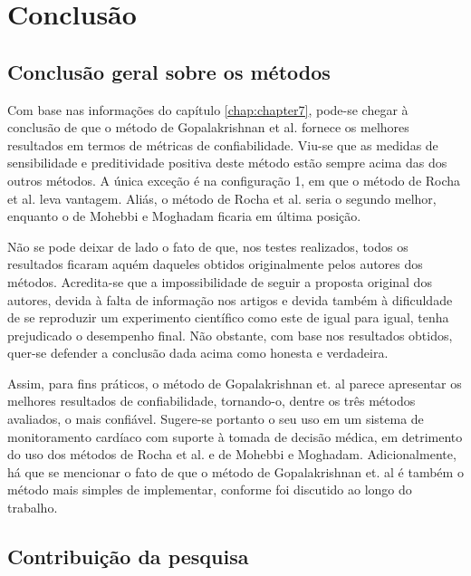 
\chapter[Conclusão]{Conclusão}
\thispagestyle{empty}
\label{chap:chapter8}

\section{Conclusão geral sobre os métodos}
Com base nas informações do capítulo \ref{chap:chapter7}, pode-se chegar à conclusão de que o método de Gopalakrishnan et al. fornece os melhores resultados em termos de métricas de confiabilidade. Viu-se que as medidas de sensibilidade e preditividade positiva deste método estão sempre acima das dos outros métodos. A única exceção é na configuração 1, em que o método de Rocha et al. leva vantagem. Aliás, o método de Rocha et al. seria o segundo melhor, enquanto o de Mohebbi e Moghadam ficaria em última posição.

Não se pode deixar de lado o fato de que, nos testes realizados, todos os resultados ficaram aquém daqueles obtidos originalmente pelos autores dos métodos. Acredita-se que a impossibilidade de seguir a proposta original dos autores, devida à falta de informação nos artigos e devida também à dificuldade de se reproduzir um experimento científico como este de igual para igual, tenha prejudicado o desempenho final. Não obstante, com base nos resultados obtidos, quer-se defender a conclusão dada acima como honesta e verdadeira.

Assim, para fins práticos, o método de Gopalakrishnan et. al parece apresentar os melhores resultados de confiabilidade, tornando-o, dentre os três métodos avaliados, o mais confiável. Sugere-se portanto o seu uso em um sistema de monitoramento cardíaco com suporte à tomada de decisão médica, em detrimento do uso dos métodos de Rocha et al. e de Mohebbi e Moghadam. Adicionalmente, há que se mencionar o fato de que o método de Gopalakrishnan et. al é também o método mais simples de implementar, conforme foi discutido ao longo do trabalho.

\section{Contribuição da pesquisa}

